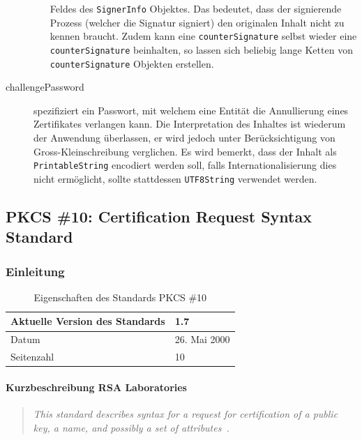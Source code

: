 \documentclass[10pt,a4paper]{article}
\begin{document}
\begin{description}
\begin{itemize}
                Feldes des \texttt{SignerInfo} Objektes. Das bedeutet, dass der
                signierende Prozess (welcher die Signatur signiert) den originalen Inhalt
                nicht zu kennen braucht. Zudem kann eine \texttt{counterSignature} selbst
                wieder eine \texttt{counterSignature} beinhalten, so lassen sich beliebig
                lange Ketten von \texttt{counterSignature} Objekten erstellen.
        \end{itemize}
    \item[challengePassword] spezifiziert ein Passwort, mit welchem eine Entität die
        Annullierung eines Zertifikates verlangen kann. Die Interpretation des Inhaltes
        ist wiederum der Anwendung überlassen, er wird jedoch unter Berücksichtigung von
        Gross-Kleinschreibung verglichen. Es wird bemerkt, dass der Inhalt als
        \texttt{PrintableString} encodiert werden soll, falls Internationalisierung dies
        nicht ermöglicht, sollte stattdessen \texttt{UTF8String} verwendet werden.
\end{description}

\subsection{PKCS \#10: Certification Request Syntax Standard}

\subsubsection{Einleitung}

\begin{table}[ht]
    \centering
    \begin{tabular}{|l|p{7.2cm}|} \hline
        Aktuelle Version des Standards & 1.7 \\\hline
        Datum & 26. Mai 2000 \\\hline
        Seitenzahl & 10 \\\hline
    \end{tabular}
    \caption{Eigenschaften des Standards PKCS \#10}
    \label{tab:pkcs-10-properties}
\end{table}

\paragraph{Kurzbeschreibung RSA Laboratories}
\begin{quotation}
    \itshape This standard describes syntax for a request for certification of a public
    key, a name, and possibly a set of attributes~\cite{pkcs10}.
\end{quotation}
\end{document}
